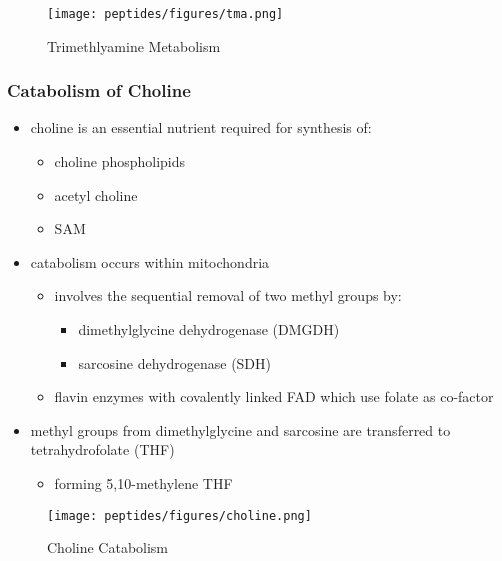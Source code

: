 \documentclass[12pt]{scrartcl}
\begin{document}
\begin{figure}[htbp]
\centering
\texttt{[image: peptides/figures/tma.png]}
\caption{\label{fig:orgf46ed0e}Trimethlyamine Metabolism}
\end{figure}

\subsubsection{Catabolism of Choline}
\label{sec:org0fdf9b1}
\begin{itemize}
\item choline is an essential nutrient required for synthesis of:
\begin{itemize}
\item choline phospholipids
\item acetyl choline
\item SAM
\end{itemize}
\item catabolism occurs within mitochondria
\begin{itemize}
\item involves the sequential removal of two methyl groups by:
\begin{itemize}
\item dimethylglycine dehydrogenase (DMGDH)
\item sarcosine dehydrogenase (SDH)
\end{itemize}
\item flavin enzymes with covalently linked FAD which use folate as co-factor
\end{itemize}
\item methyl groups from dimethylglycine and sarcosine are transferred to
tetrahydrofolate (THF)
\begin{itemize}
\item forming 5,10-methylene THF
\end{itemize}
\end{itemize}

\begin{figure}[htbp]
\centering
\texttt{[image: peptides/figures/choline.png]}
\caption{\label{fig:org6d0adc3}Choline Catabolism}
\end{figure}
\end{document}
